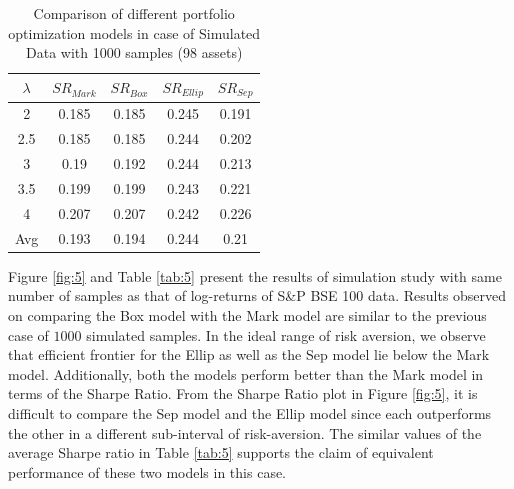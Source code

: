 \begin{table}[!h]
    \centering
    \captionsetup{justification=centering}
   \begin{tabular}{||c|c|c|c|c||}
   \hline
  
  
  $\lambda$ & $SR_{Mark}$ & $SR_{Box}$ & $SR_{Ellip}$ & $SR_{Sep}$ \\
  
  \hline
 2 & 0.185 & 0.185 & 0.245 & 0.191 \\
 2.5 & 0.185 & 0.185 & 0.244 & 0.202 \\
 3 & 0.19 & 0.192 & 0.244 & 0.213 \\
 3.5 & 0.199 & 0.199 & 0.243 & 0.221 \\
 4 & 0.207 & 0.207 & 0.242 & 0.226 \\
  \hline
  Avg & 0.193 & 0.194 & 0.244 & 0.21 \\
  \hline

\end{tabular}
    \caption{Comparison of different portfolio optimization models in case of Simulated Data with 1000 samples (98 assets)}
    \label{tab:4}
\end{table}

Figure \ref{fig:5} and Table \ref{tab:5} present the results of simulation study with same number of samples as that of log-returns of S\&P BSE 100 data. Results observed on comparing the Box model with the Mark model are similar to the previous case of $1000$ simulated samples.  In the ideal range of risk aversion, we observe that efficient frontier for the Ellip as well as the Sep model lie below the Mark model. Additionally, both the models perform better than the Mark model in terms of the Sharpe Ratio. From the Sharpe Ratio plot in Figure \ref{fig:5}, it is difficult to compare the Sep model and the Ellip model since each outperforms the other in a different sub-interval of risk-aversion. The similar values of the average Sharpe ratio in Table \ref{tab:5} supports the claim of equivalent performance of these two models in this case.

